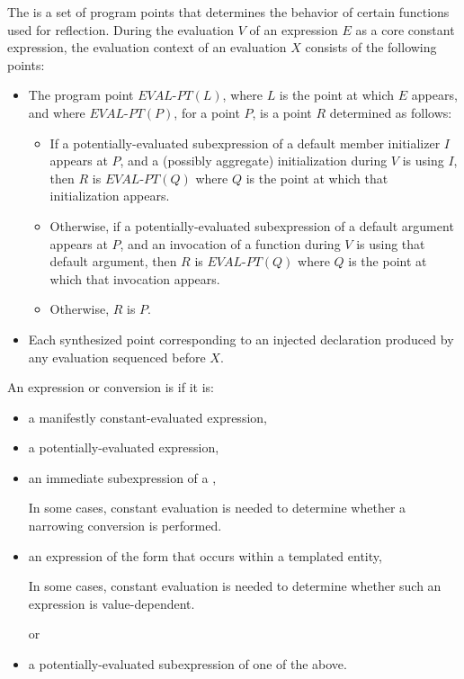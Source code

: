 \pnum
The  is a set of program points
that determines the behavior of certain functions
used for reflection.
During the evaluation $V$ of an expression $E$ as a core constant expression,
the evaluation context of an evaluation $X$
consists of the following points:
\begin{itemize}
\item
The program point $\textit{EVAL-PT}(L)$,
where $L$ is the point at which $E$ appears, and
where $\textit{EVAL-PT}(P)$, for a point $P$,
is a point $R$ determined as follows:
\begin{itemize}
\item
If a potentially-evaluated subexpression of
a default member initializer $I$ appears at $P$, and
a (possibly aggregate) initialization during $V$ is using $I$,
then $R$ is $\textit{EVAL-PT}(Q)$
where $Q$ is the point at which that initialization appears.
\item
Otherwise, if a potentially-evaluated subexpression of
a default argument appears at $P$, and
an invocation of a function during $V$
is using that default argument,
then $R$ is $\textit{EVAL-PT}(Q)$
where $Q$ is the point at which that invocation appears.
\item
Otherwise, $R$ is $P$.
\end{itemize}
\item
Each synthesized point corresponding to an injected declaration produced by
any evaluation sequenced before $X$.
\end{itemize}

\pnum
{}%
An expression or conversion is 
if it is:
\begin{itemize}
\item
a manifestly constant-evaluated expression,

\item
a potentially-evaluated expression,

\item
an immediate subexpression of a ,
\begin{footnote}
In some cases, constant evaluation is needed to determine whether a narrowing conversion is performed.
\end{footnote}

\item
an expression of the form \tcode{\&} 
that occurs within a templated entity,
\begin{footnote}
In some cases, constant evaluation is needed to determine whether such an expression is value-dependent.
\end{footnote}
or

\item
a potentially-evaluated subexpression of one of the above.
\end{itemize}

